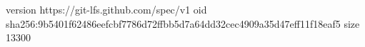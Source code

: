 version https://git-lfs.github.com/spec/v1
oid sha256:9b5401f62486eefcbf7786d72ffbb5d7a64dd32cec4909a35d47eff11f18eaf5
size 13300
